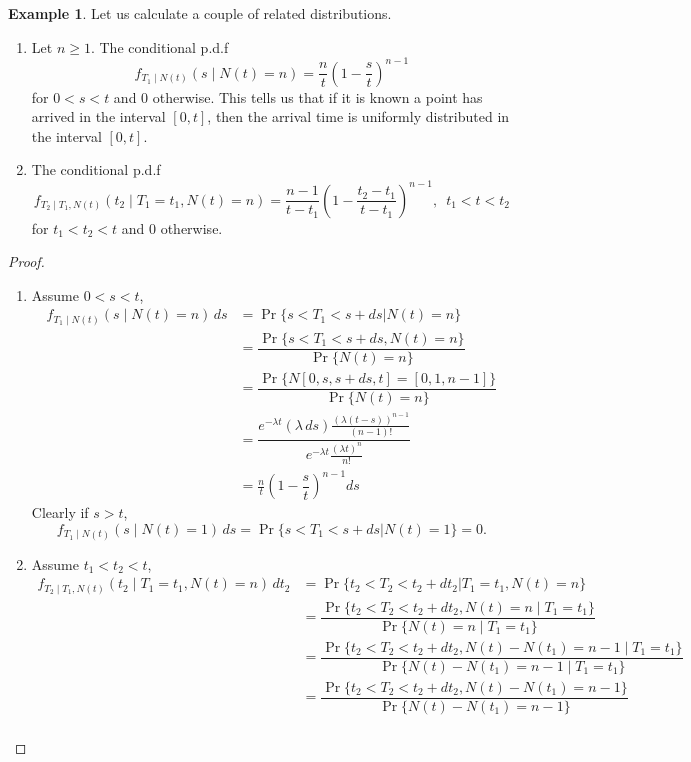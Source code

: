 \documentclass[letterpaper, 12pt]{article}
\newcommand{\1}{\mathds{1}} %
\theoremstyle{definition}
\newtheorem{example}[theorem]{Example}
\begin{document}
\begin{example}
\label{example:Nuniform}
Let us calculate a couple of related distributions.
\begin{enumerate}
\item Let $n \geq 1$. The conditional p.d.f \[f_{T_1 \mid N(t)}(s \mid N(t)=n)=\frac{n}{t} \left(1-\dfrac{s}{t}\right)^{n-1}\] for $0<s<t$ and $0$ otherwise. This tells us that if it is known a point has arrived in the interval $[0,t]$, then the arrival time is uniformly distributed in the interval $[0,t]$.
\item The conditional p.d.f \[f_{T_2 \mid T_1, N(t)}(t_2 \mid T_1=t_1, N(t)=n)=\dfrac{n-1}{t-t_1}\left(1- \dfrac{t_2-t_1}{t-t_1}\right)^{n-1}, \,\,\, t_1 < t < t_2 \] for $t_1<t_2<t$ and $0$ otherwise.
\end{enumerate}
\begin{proof}
\begin{enumerate}
\item Assume $0 < s< t$, 
\begin{align*}
f_{T_1 \mid N(t)}(s \mid N(t)=n)\, ds &= \Pr\{s < T_1 < s+ds | N(t)=n\}\\
                                      &= \dfrac{\Pr\{s < T_1 < s+ds , N(t)=n\}}{\Pr\{N(t)=n\}}\\
                                      &= \dfrac{\Pr\{N[0,s,s+ds,t]=[0,1,n-1]\}}{\Pr\{N(t)=n\}}\\
                                      &= \dfrac{e^{-\lambda t}(\lambda \, ds) \frac{(\lambda(t-s))^{n-1}}{(n-1)!}}{e^{-\lambda t}\frac{(\lambda t)^n}{n!}}\\
                                      &= \frac{n}{t} \left(1-\dfrac{s}{t}\right)^{n-1}ds
\end{align*}
Clearly if $s > t$, \[f_{T_1 \mid N(t)}(s \mid N(t)=1) \, ds = \Pr\{s < T_1 < s+ds | N(t)=1\} = 0.\]
\item Assume $t_1 < t_2 < t$,
\begin{align*}
f_{T_2 \mid T_1, N(t)}(t_2 \mid T_1=t_1, N(t)=n)\, dt_2 &= \Pr\{t_2 < T_2 < t_2+dt_2 |T_1=t_1, N(t)=n\}\\
                                      &= \dfrac{\Pr\{t_2 < T_2 < t_2+dt_2 , N(t)=n \mid T_1=t_1\}}{\Pr\{N(t)=n \mid T_1=t_1\}}\\
                                      &= \dfrac{\Pr\{t_2 < T_2 < t_2+dt_2 , N(t) - N(t_1)=n-1 \mid T_1=t_1\}}{\Pr\{N(t) - N(t_1)=n-1 \mid T_1=t_1\}}\\
                                      &= \dfrac{\Pr\{t_2 < T_2 < t_2+dt_2 , N(t) - N(t_1)=n-1\}}{\Pr\{N(t) - N(t_1)=n-1\}}\\

\end{align*}
\end{enumerate}
\end{proof}
\end{example}
\end{document}
